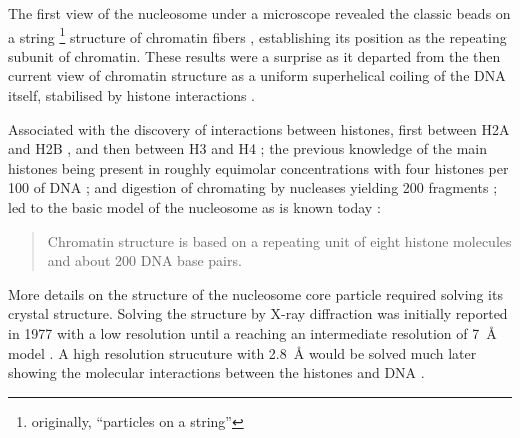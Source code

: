     The first view of the nucleosome under a microscope revealed the
    classic beads on a string \footnote{originally, ``particles on a string''}
    structure of chromatin fibers
     \citep{olin1974-nu-bodies},
    establishing its position as the repeating subunit of chromatin.
    These results were a surprise as it departed from the then current view
    of chromatin structure as a uniform superhelical coiling of the
    DNA itself, stabilised by histone interactions
    \citep{pardon-wilkins-1972model}.

    Associated with the discovery of interactions between histones,
    first between H2A and H2B \citep{anna-isenberg-1974-h2a-h2b}, and
    then between H3 and H4 \citep{kornberg1974-results};
    the previous knowledge of the main histones being present in
    roughly equimolar concentrations with four histones per
    \SI{100}{\bp} of DNA ;
    and digestion of chromating by nucleases yielding
    \SI{200}{\bp} fragments \citep{hewish1973-200bp-pieces};
    led to the basic model of the nucleosome as is known today
    :

    \begin{quotation}
      Chromatin structure is based on a repeating unit of eight
      histone molecules and about 200 DNA base pairs.
    \end{quotation}

    More details on the structure of the nucleosome core particle required
    solving its crystal structure.  Solving the structure by X-ray
    diffraction was initially reported in 1977
    \citep{finch1977-first-structure}
    with a low resolution until a reaching an
    intermediate resolution of \SI{7}{\angstrom} model \citep{richmond1984-7angstrom}.
    A high resolution strucuture with \SI{2.8}{\angstrom} would be solved much later
    showing the molecular interactions between the histones and DNA
    \citep{luger1997-28angstrom}.


